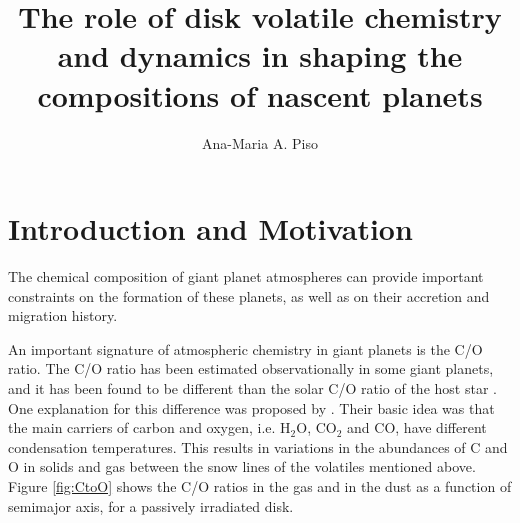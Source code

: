 \documentclass[manuscript]{aastex}
\begin{document}


\title{The role of disk volatile chemistry and dynamics in shaping the compositions of nascent planets}
\author{Ana-Maria A. Piso}

\section{Introduction and Motivation}



The chemical composition of giant planet atmospheres can provide important constraints on the formation of these planets, as well as on their accretion and migration history. 



An important signature of atmospheric chemistry in giant planets is the C/O ratio. The C/O ratio has been estimated observationally in some giant planets, and it has been found to be different than the solar C/O ratio of the host star \citep{madhu11}. One explanation for this difference was proposed by \citet{oberg11}. Their basic idea was that the main carriers of carbon and oxygen, i.e. H$_2$O, CO$_2$ and CO, have different condensation temperatures. This results in variations in the abundances of C and O in solids and gas between the snow lines of the volatiles mentioned above. Figure \ref{fig:CtoO} shows the C/O ratios in the gas and in the dust as a function of semimajor axis, for a passively irradiated disk. %

\end{document}
